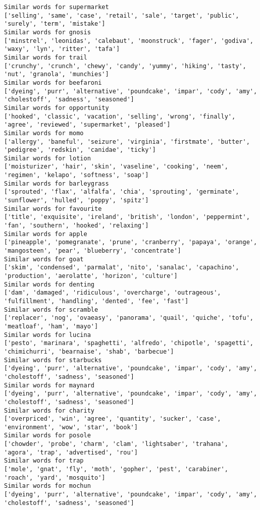 \documentclass[11pt]{article}
\begin{document}
\begin{Verbatim}[commandchars=\\\{\}]
Similar words for supermarket
['selling', 'same', 'case', 'retail', 'sale', 'target', 'public', 'surely', 'term', 'mistake']
Similar words for gnosis
['minstrel', 'leonidas', 'calebaut', 'moonstruck', 'fager', 'godiva', 'waxy', 'lyn', 'ritter', 'tafa']
Similar words for trail
['crunchy', 'crunch', 'chewy', 'candy', 'yummy', 'hiking', 'tasty', 'nut', 'granola', 'munchies']
Similar words for beefaroni
['dyeing', 'purr', 'alternative', 'poundcake', 'impar', 'cody', 'amy', 'cholestoff', 'sadness', 'seasoned']
Similar words for opportunity
['hooked', 'classic', 'vacation', 'selling', 'wrong', 'finally', 'agree', 'reviewed', 'supermarket', 'pleased']
Similar words for momo
['allergy', 'baneful', 'seizure', 'virginia', 'firstmate', 'butter', 'pedigree', 'redskin', 'canidae', 'ticky']
Similar words for lotion
['moisturizer', 'hair', 'skin', 'vaseline', 'cooking', 'neem', 'regimen', 'kelapo', 'softness', 'soap']
Similar words for barleygrass
['sprouted', 'flax', 'alfalfa', 'chia', 'sprouting', 'germinate', 'sunflower', 'hulled', 'poppy', 'spitz']
Similar words for favourite
['title', 'exquisite', 'ireland', 'british', 'london', 'peppermint', 'fan', 'southern', 'hooked', 'relaxing']
Similar words for apple
['pineapple', 'pomegranate', 'prune', 'cranberry', 'papaya', 'orange', 'mangosteen', 'pear', 'blueberry', 'concentrate']
Similar words for goat
['skim', 'condensed', 'parmalat', 'nito', 'sanalac', 'capachino', 'production', 'aerolatte', 'horizon', 'culture']
Similar words for denting
['dam', 'damaged', 'ridiculous', 'overcharge', 'outrageous', 'fulfillment', 'handling', 'dented', 'fee', 'fast']
Similar words for scramble
['replacer', 'nog', 'ovaeasy', 'panorama', 'quail', 'quiche', 'tofu', 'meatloaf', 'ham', 'mayo']
Similar words for lucina
['pesto', 'marinara', 'spaghetti', 'alfredo', 'chipotle', 'spagetti', 'chimichurri', 'bearnaise', 'shab', 'barbecue']
Similar words for starbucks
['dyeing', 'purr', 'alternative', 'poundcake', 'impar', 'cody', 'amy', 'cholestoff', 'sadness', 'seasoned']
Similar words for maynard
['dyeing', 'purr', 'alternative', 'poundcake', 'impar', 'cody', 'amy', 'cholestoff', 'sadness', 'seasoned']
Similar words for charity
['overpriced', 'win', 'agree', 'quantity', 'sucker', 'case', 'environment', 'wow', 'star', 'book']
Similar words for posole
['chowder', 'probe', 'charm', 'clam', 'lightsaber', 'trahana', 'agora', 'trap', 'advertised', 'rou']
Similar words for trap
['mole', 'gnat', 'fly', 'moth', 'gopher', 'pest', 'carabiner', 'roach', 'yard', 'mosquito']
Similar words for mochun
['dyeing', 'purr', 'alternative', 'poundcake', 'impar', 'cody', 'amy', 'cholestoff', 'sadness', 'seasoned']

\end{Verbatim}
\end{document}
